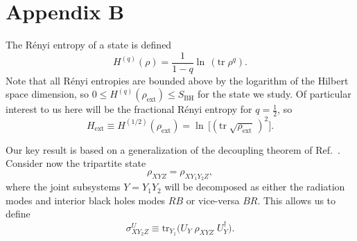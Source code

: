 \documentclass[twocolumn,aps,prl]{revtex4}
\begin{document}
\section{Appendix B}
\label{decoupling}

The R\'enyi entropy of a state is defined
\begin{equation}
H^{(q)}(\rho)=\frac{1}{1-q} \ln \,({\text{tr}}\; \rho^q).
\end{equation}
Note that all R\'enyi entropies are bounded above by the logarithm of
the Hilbert space dimension, so
 $0\le H^{(q)}(\rho_{\text{ext}})\le S_{\text{BH}}$
for the state we study. Of particular interest to us here will be the
fractional R\'enyi entropy for $q=\frac{1}{2}$, so
\begin{equation}
H_{\text{ext}} \equiv H^{(1/2)}(\rho_{\text{ext}})
=\ln \,\bigl[({\text{tr}}\;\sqrt{\rho_{\text{ext}}}\,)^2\bigr].
\end{equation}

Our key result is based on a generalization of the decoupling theorem of
Ref.~. Consider now the tripartite state
\begin{equation}
\rho_{XYZ}^{\text{~}}=
\rho_{XY_1Y_2Z}^{\text{~}},
\end{equation}
where the joint subsystems $Y=Y_1Y_2$ will be decomposed as either
the radiation modes and interior black holes modes $RB$ or vice-versa
$BR$. This allows us to define
\begin{equation}
\sigma_{XY_2Z}^U\equiv
\text{tr}_{Y_1}^{\text{~}} \bigl(U_{Y}\;
\rho_{XYZ}^{\text{~}}\; U_{Y}^\dagger\bigr).
\end{equation}
\end{document}
